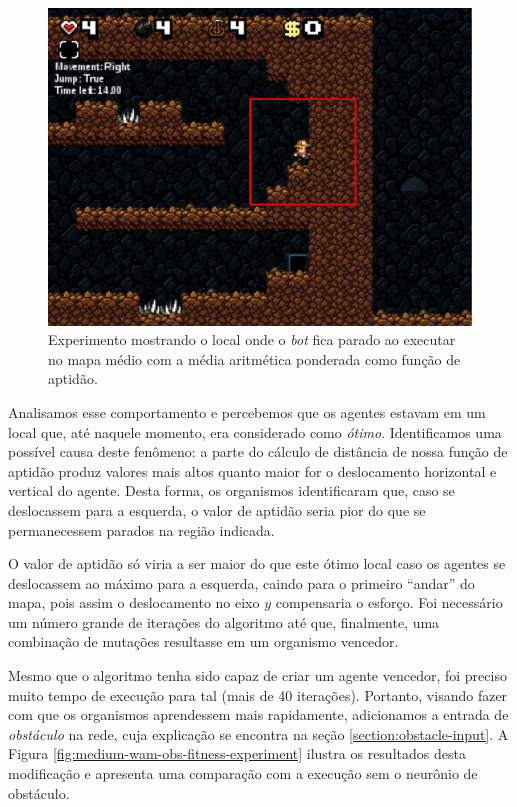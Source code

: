 \begin{figure}[htb!]
\centering
\includegraphics[width=.5\textwidth]{fig/experiment-medium-stuck.pdf}
\caption{Experimento mostrando o local onde o \textit{bot} fica parado ao
    executar no mapa médio com a média aritmética ponderada como função de
    aptidão.}
\label{fig:experiment-medium-stuck}
\end{figure}

Analisamos esse comportamento e percebemos que os agentes estavam em um local
que, até naquele momento, era considerado como \textit{ótimo}.  Identificamos
uma possível causa deste fenômeno: a parte do cálculo de distância de nossa
função de aptidão produz valores mais altos quanto maior for o deslocamento
horizontal e vertical do agente. Desta forma, os organismos identificaram que,
caso se deslocassem para a esquerda, o valor de aptidão seria pior do que se
permanecessem parados na região indicada.

O valor de aptidão só viria a ser maior do que este ótimo local caso os agentes
se deslocassem ao máximo para a esquerda, caindo para o primeiro ``andar'' do
mapa, pois assim o deslocamento no eixo $y$ compensaria o esforço. Foi
necessário um número grande de iterações do algoritmo até que, finalmente, uma
combinação de mutações resultasse em um organismo vencedor.

Mesmo que o algoritmo tenha sido capaz de criar um agente vencedor, foi preciso
muito tempo de execução para tal (mais de 40 iterações). Portanto, visando fazer
com que os organismos aprendessem mais rapidamente, adicionamos a entrada de
\textit{obstáculo} na rede, cuja explicação se encontra na seção
\ref{section:obstacle-input}. A Figura
\ref{fig:medium-wam-obs-fitness-experiment} ilustra os resultados desta
modificação e apresenta uma comparação com a execução sem o neurônio de
obstáculo.

